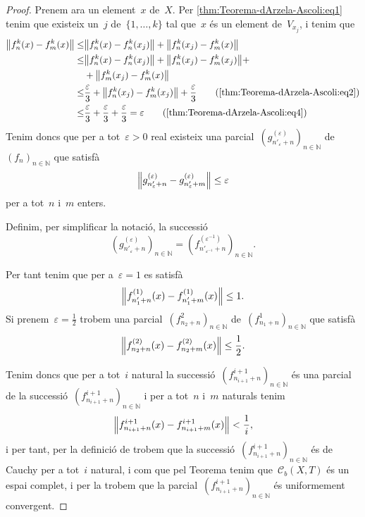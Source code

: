 \documentclass[../../main.tex]{subfiles}
\begin{document}
\begin{proof}
        Prenem ara un element~\(x\) de~\(X\).
        Per \eqref{thm:Teorema-dArzela-Ascoli:eq1} tenim que existeix un~\(j\) de~\(\{1,\dots,k\}\) tal que~\(x\) és un element de~\(V_{x_{j}}\), i tenim que
        \begin{align*}
            \norm{f^{k}_{n}(x)-f^{k}_{m}(x)}\leq&\norm{f^{k}_{n}(x)-f^{k}_{n}(x_{j})}+\norm{f^{k}_{n}(x_{j})-f^{k}_{m}(x)} \\
            \leq&\norm{f^{k}_{n}(x)-f^{k}_{n}(x_{j})}+\norm{f^{k}_{n}(x_{j})-f^{k}_{m}(x_{j})}+\\&+\norm{f^{k}_{m}(x_{j})-f^{k}_{m}(x)} \\
            \leq&\frac{\varepsilon}{3}+\norm{f^{k}_{n}(x_{j})-f^{k}_{m}(x_{j})}+\frac{\varepsilon}{3}\tag{\ref{thm:Teorema-dArzela-Ascoli:eq2}} \\
            \leq&\frac{\varepsilon}{3}+\frac{\varepsilon}{3}+\frac{\varepsilon}{3}=\varepsilon\tag{\ref{thm:Teorema-dArzela-Ascoli:eq4}}
        \end{align*}
        Tenim doncs que per a tot~\(\varepsilon>0\) real existeix una parcial~\((g^{(\varepsilon)}_{n'_{\varepsilon}+n})_{n\in\mathbb{N}}\) de~\((f_{n})_{n\in\mathbb{N}}\) que satisfà
        \[
            \norm{g^{(\varepsilon)}_{n'_{\varepsilon}+n}-g^{(\varepsilon)}_{n'_{\varepsilon}+m}}\leq\varepsilon
        \]
        per a tot~\(n\) i~\(m\) enters.

        Definim, per simplificar la notació, la successió
        \[
            \left(g^{(\varepsilon)}_{n'_{\varepsilon}+n}\right)_{n\in\mathbb{N}}=\left(f^{(\varepsilon^{-1})}_{n'_{\varepsilon^{-1}}+n}\right)_{n\in\mathbb{N}}.
        \]

        Per tant tenim que per a~\(\varepsilon=1\) es satisfà
        \[
            \norm{f^{(1)}_{n'_{1}+n}(x)-f^{(1)}_{n'_{1}+m}(x)}\leq1.
        \]
        Si prenem~\(\varepsilon=\frac{1}{2}\) trobem una parcial~\((f^{2}_{n_{2}+n})_{n\in\mathbb{N}}\) de~\((f^{1}_{n_{1}+n})_{n\in\mathbb{N}}\) que satisfà
        \[
            \norm{f^{(2)}_{n_{2}+n}(x)-f^{(2)}_{n_{2}+m}(x)}\leq\frac{1}{2}.
        \]

        Tenim doncs que per a tot~\(i\) natural la successió~\((f^{i+1}_{n_{i+1}+n})_{n\in\mathbb{N}}\) és una parcial de la successió~\((f^{i+1}_{n_{i+1}+n})_{n\in\mathbb{N}}\) i per a tot~\(n\) i~\(m\) naturals tenim
        \[
            \norm{f^{i+1}_{n_{i+1}+n}(x)-f^{i+1}_{n_{i+1}+m}(x)}<\frac{1}{i},
        \]
        i per tant, per la definició de  trobem que la successió~\((f^{i+1}_{n_{i+1}+n})_{n\in\mathbb{N}}\) és de Cauchy per a tot~\(i\) natural, i com que pel Teorema  tenim que~\(\mathcal{C}_{b}(X,T)\) és un espai complet, i per la  trobem que la parcial~\((f^{i+1}_{n_{i+1}+n})_{n\in\mathbb{N}}\) és uniformement convergent.
    \end{proof}
\end{document}
